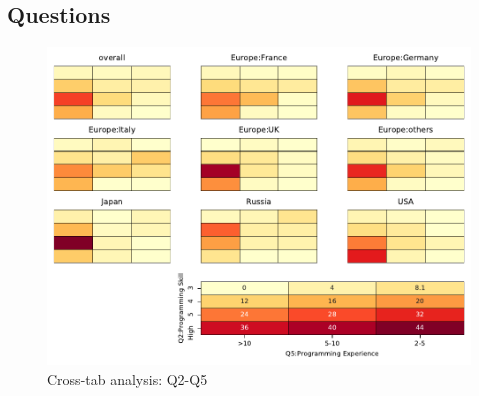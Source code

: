 
\subsection{Questions}


\begin{figure}
\begin{center}
\includegraphics[width=12cm]{../pdfs/Q2-Q5.pdf}
\caption{Cross-tab analysis: Q2-Q5}
\label{fig:Q2-Q5}
\end{center}
\end{figure}
